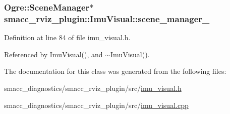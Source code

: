 \subsubsection[{\texorpdfstring{scene\+\_\+manager\+\_\+}{scene_manager_}}]{\setlength{\rightskip}{0pt plus 5cm}Ogre\+::\+Scene\+Manager$\ast$ smacc\+\_\+rviz\+\_\+plugin\+::\+Imu\+Visual\+::scene\+\_\+manager\+\_\+\hspace{0.3cm}{\ttfamily [private]}}\hypertarget{classsmacc__rviz__plugin_1_1ImuVisual_acef4dba58d14224192bbed7eabbd6cbb}{}\label{classsmacc__rviz__plugin_1_1ImuVisual_acef4dba58d14224192bbed7eabbd6cbb}


Definition at line 84 of file imu\+\_\+visual.\+h.



Referenced by Imu\+Visual(), and $\sim$\+Imu\+Visual().



The documentation for this class was generated from the following files\+:\begin{DoxyCompactItemize}
\item 
smacc\+\_\+diagnostics/smacc\+\_\+rviz\+\_\+plugin/src/\hyperlink{imu__visual_8h}{imu\+\_\+visual.\+h}\item 
smacc\+\_\+diagnostics/smacc\+\_\+rviz\+\_\+plugin/src/\hyperlink{imu__visual_8cpp}{imu\+\_\+visual.\+cpp}\end{DoxyCompactItemize}

